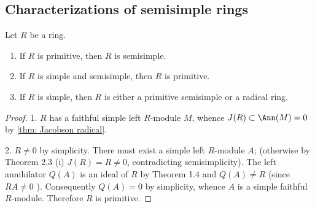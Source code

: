 \subsection{Characterizations of semisimple rings}
\begin{theorem}
    Let $R$ be a ring.
    \begin{enumerate}
        \item
              If $R$ is primitive, then $R$ is semisimple.
        \item
              If $R$ is simple and semisimple, then $R$ is primitive.
        \item
              If $R$ is simple, then $R$ is either a primitive semisimple or a radical ring.
    \end{enumerate}
    \begin{proof}
        1.
        $R$ has a faithful simple left $R$-module $M$, whence $J(R) \subset \Ann(M)=0$ by \ref{thm: Jacobson radical}.

        2.
        $R \neq 0$ by simplicity. There must exist a simple left $R$-module $A$; (otherwise by Theorem 2.3 (i) $J(R)=R \neq 0$, contradicting semisimplicity). The left annihilator $Q(A)$ is an ideal of $R$ by Theorem 1.4 and $Q(A) \neq R$ (since $R A \neq 0$ ). Consequently $Q(A)=0$ by simplicity, whence $A$ is a simple faithful $R$-module. Therefore $R$ is primitive.
    \end{proof}
\end{theorem}















